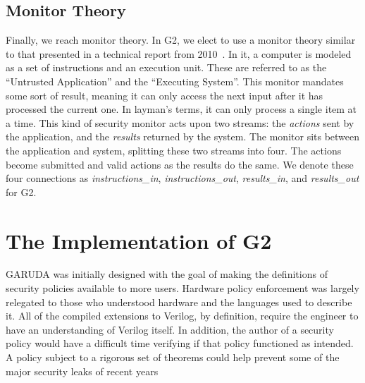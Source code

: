 \documentclass[sigconf,usenames,dvipsnames,svgnames,table]{acmart}
\def \sysname {\textsc{G2}\xspace}
\def \oldname {\textsc{GARUDA}\xspace}
\begin{document}
    \subsection{Monitor Theory}\label{sec:prior:mon}
      Finally, we reach monitor theory.
      In \sysname, we elect to use a monitor theory similar to that presented in a technical report from 2010~\cite{2010monitor}.
      In it, a computer is modeled as a set of instructions and an execution unit.
      These are referred to as the ``Untrusted Application'' and the ``Executing System''.
      This monitor mandates some sort of result, meaning it can only access the next input after it has processed the current one.
      In layman's terms, it can only process a single item at a time.
      This kind of security monitor acts upon two streams: the \textit{actions} sent by the application, and the \textit{results} returned by the system.
      The monitor sits between the application and system, splitting these two streams into four.
      The actions become submitted and valid actions as the results do the same.
      We denote these four connections as \textit{instructions\_in}, \textit{instructions\_out}, \textit{results\_in}, and \textit{results\_out} for \sysname.

  
  \section{The Implementation of \sysname}\label{sec:spec}
    \oldname was initially designed with the goal of making the definitions of security policies available to more users.
    Hardware policy enforcement was largely relegated to those who understood hardware and the languages used to describe it.
    All of the compiled extensions to Verilog, by definition, require the engineer to have an understanding of Verilog itself.
    In addition, the author of a security policy would have a difficult time verifying if that policy functioned as intended.
    A policy subject to a rigorous set of theorems could help prevent some of the major security leaks of recent years~\cite{2018spectre, 2018meltdown}
    \par
\end{document}
